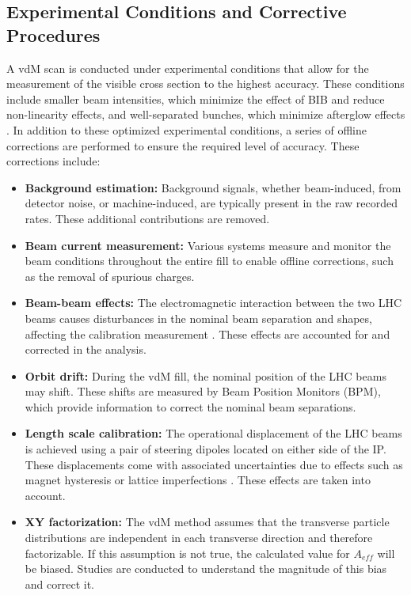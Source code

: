 \subsection{Experimental Conditions and Corrective Procedures}
\label{sec:experiment_conditions_and_corrective_procedures}

A vdM scan is conducted under experimental conditions that allow for the measurement of the visible cross section to the highest accuracy. These conditions include smaller beam intensities, which minimize the effect of BIB and reduce non-linearity effects, and well-separated bunches, which minimize afterglow effects \cite{GRAFSTROM201597}. In addition to these optimized experimental conditions, a series of offline corrections are performed to ensure the required level of accuracy. These corrections include:

\begin{itemize}
    \item \textbf{Background estimation:} Background signals, whether beam-induced, from detector noise, or machine-induced, are typically present in the raw recorded rates. These additional contributions are removed.
    \item \textbf{Beam current measurement:} Various systems measure and monitor the beam conditions throughout the entire fill to enable offline corrections, such as the removal of spurious charges.
    \item \textbf{Beam-beam effects:} The electromagnetic interaction between the two LHC beams causes disturbances in the nominal beam separation and shapes, affecting the calibration measurement \cite{Babaev2024}. These effects are accounted for and corrected in the analysis.
    \item \textbf{Orbit drift:} During the vdM fill, the nominal position of the LHC beams may shift. These shifts are measured by Beam Position Monitors (BPM), which provide information to correct the nominal beam separations.
    \item \textbf{Length scale calibration:} The operational displacement of the LHC beams is achieved using a pair of steering dipoles located on either side of the IP. These displacements come with associated uncertainties due to effects such as magnet hysteresis or lattice imperfections \cite{Persson:2750277}. These effects are taken into account.
    \item \textbf{XY factorization:} The vdM method assumes that the transverse particle distributions are independent in each transverse direction and therefore factorizable. If this assumption is not true, the calculated value for \(A_{eff}\) will be biased. Studies are conducted to understand the magnitude of this bias and correct it.
\end{itemize}

